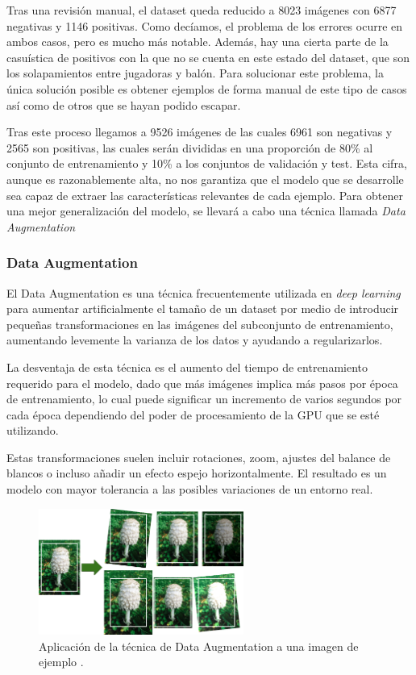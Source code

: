 Tras una revisión manual, el dataset queda reducido a 8023 imágenes con 6877 negativas y 1146 positivas. Como decíamos, el problema de los errores ocurre en ambos casos, pero es mucho más notable. Además, hay una cierta parte de la casuística de positivos con la que no se cuenta en este estado del dataset, que son los solapamientos entre jugadoras y balón. Para solucionar este problema, la única solución posible es obtener ejemplos de forma manual de este tipo de casos así como de otros que se hayan podido escapar.

Tras este proceso llegamos a 9526 imágenes de las cuales 6961 son negativas y 2565 son positivas, las cuales serán divididas en una proporción de 80\% al conjunto de entrenamiento y 10\% a los conjuntos de validación y test. Esta cifra, aunque es razonablemente alta, no nos garantiza que el modelo que se desarrolle sea capaz de extraer las características relevantes de cada ejemplo. Para obtener una mejor generalización del modelo, se llevará a cabo una técnica llamada \textit{Data Augmentation}

\subsubsection*{Data Augmentation}

El Data Augmentation es una técnica frecuentemente utilizada en \textit{deep learning} para aumentar artificialmente el tamaño de un dataset por medio de introducir pequeñas transformaciones en las imágenes del subconjunto de entrenamiento, aumentando levemente la varianza de los datos y ayudando a regularizarlos.

La desventaja de esta técnica es el aumento del tiempo de entrenamiento requerido para el modelo, dado que más imágenes implica más pasos por época de entrenamiento, lo cual puede significar un incremento de varios segundos por cada época dependiendo del poder de procesamiento de la GPU que se esté utilizando.

Estas transformaciones suelen incluir rotaciones, zoom, ajustes del balance de blancos o incluso añadir un efecto espejo horizontalmente. El resultado es un modelo con mayor tolerancia a las posibles variaciones de un entorno real.

\begin{figure}[H]
  \centering
  \includegraphics[width=0.6\textwidth]{images/dataAug}
  \caption{Aplicación de la técnica de Data Augmentation a una imagen de ejemplo \cite{book:homl}.}
  \label{fig:dataAug}
\end{figure}


